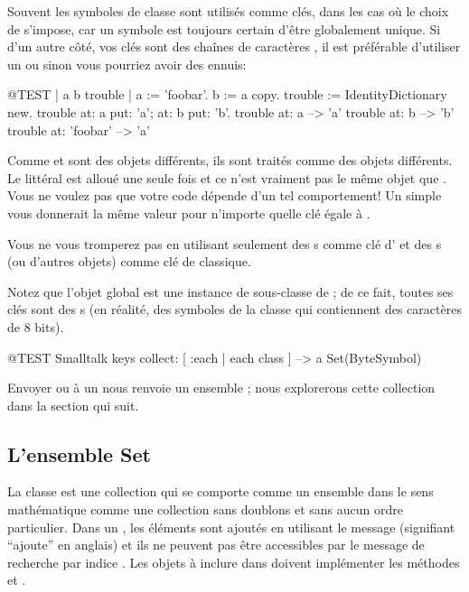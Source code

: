 \documentclass[a4paper,10pt,twoside]{book}
\begin{document}
Souvent les symboles de classe  sont utilis\'es comme cl\'es, dans les cas o\`u le choix de  s'impose, car un symbole est toujours certain d'\^etre globalement unique. Si d'un autre c\^ot\'e, vos cl\'es sont des chaînes de caract\`eres 
, il est pr\'ef\'erable d'utiliser un  ou sinon vous pourriez avoir des ennuis:

\begin{code}{@TEST | a b trouble |}
a := 'foobar'.
b := a copy.
trouble := IdentityDictionary new.
trouble at: a put: 'a'; at: b put: 'b'.
trouble at: a          --> 'a'
trouble at: b          --> 'b'
trouble at: 'foobar' --> 'a'
\end{code}

\noindent
Comme  et  sont des objets diff\'erents, ils sont trait\'es comme des objets diff\'erents.
Le litt\'eral \mbox{} est allou\'e une seule fois et
ce n'est vraiment pas le m\^eme objet que .
Vous ne voulez pas que votre code d\'epende d'un tel comportement!
Un simple  vous donnerait la m\^eme valeur pour n'importe quelle
cl\'e \'egale \`a .

Vous ne vous tromperez pas en utilisant seulement des s comme cl\'e d' et des s (ou d'autres objets) comme cl\'e de  classique.

Notez que l'objet global  est une instance de  sous-classe de  ; de ce fait, toutes ses cl\'es sont des s (en r\'ealit\'e, des symboles de la classe  qui contiennent des caract\`eres de 8 bits).

\begin{code}{@TEST}
Smalltalk keys collect: [ :each | each class ] --> a Set(ByteSymbol)
\end{code}
\noindent
Envoyer  ou  \`a un  nous renvoie 
un ensemble ; nous explorerons cette collection dans la section
qui suit.

\subsection{L'ensemble Set}
La classe  est une collection qui se comporte comme un ensemble
dans le sens math\'ematique \ie comme une collection sans doublons
et sans aucun ordre particulier. Dans un , les \'el\'ements sont
ajout\'es en utilisant le message  (signifiant
``ajoute'' en anglais) et ils ne peuvent pas \^etre accessibles par le message de recherche par indice . 
Les objets \`a inclure dans  doivent impl\'ementer les m\'ethodes  et \ct{=}.
\end{document}

